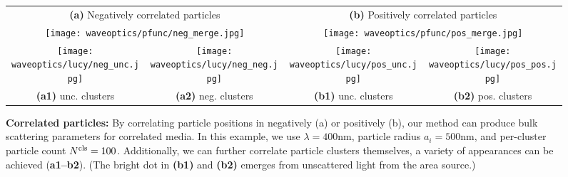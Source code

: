 \begin{figure}[!ht]
    \centering
    \setlength{\resLen}{1.4in}
    \addtolength{\tabcolsep}{-3.5pt}
    \begin{tabular}{cc|cc}
        \multicolumn{2}{c|}{\textbf{(a)} Negatively correlated particles} &
        \multicolumn{2}{c}{\textbf{(b)} Positively correlated particles}
        \\
        \multicolumn{2}{c|}{\texttt{[image: waveoptics/pfunc/neg\_merge.jpg]}} & \multicolumn{2}{c}{\texttt{[image: waveoptics/pfunc/pos\_merge.jpg]}} 
        \\
        \texttt{[image: waveoptics/lucy/neg\_unc.jpg]} &
        \texttt{[image: waveoptics/lucy/neg\_neg.jpg]} &
        \texttt{[image: waveoptics/lucy/pos\_unc.jpg]} &
        \texttt{[image: waveoptics/lucy/pos\_pos.jpg]} 
        \\
        \textbf{(a1)} unc. clusters & \textbf{(a2)} neg. clusters & \textbf{(b1)} unc. clusters & \textbf{(b2)} pos. clusters
    \end{tabular}
    \caption[Correlated particles]{\label{fig:waveoptics:correlated}
        \textbf{Correlated particles:} By correlating particle positions in negatively (a) or positively (b), our method can produce bulk scattering parameters for correlated media.
        In this example, we use $\lambda = 400\text{nm}$, particle radius $a_i = 500\text{nm}$, and per-cluster particle count $N^\mathrm{cls} = 100$.
        Additionally, we can further correlate particle clusters themselves, a variety of appearances can be achieved (\textbf{a1--b2}).
        (The bright dot in \textbf{(b1)} and \textbf{(b2)} emerges from unscattered light from the area source.)
    }
\end{figure}

